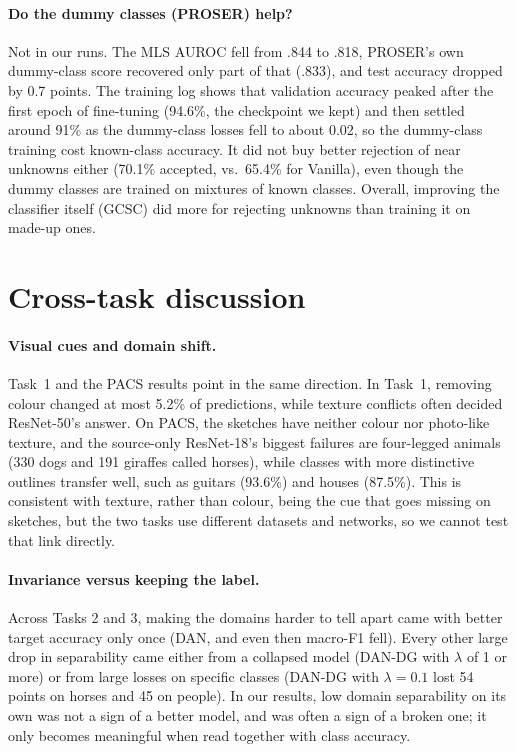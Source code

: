 \documentclass{article}
\begin{document}
\paragraph{Do the dummy classes (PROSER) help?} Not in our runs. The MLS AUROC fell from .844 to .818, PROSER's own dummy-class score recovered only part of that (.833), and test accuracy dropped by 0.7 points. The training log shows that validation accuracy peaked after the first epoch of fine-tuning (94.6\%, the checkpoint we kept) and then settled around 91\% as the dummy-class losses fell to about 0.02, so the dummy-class training cost known-class accuracy. It did not buy better rejection of near unknowns either (70.1\% accepted, vs.\ 65.4\% for Vanilla), even though the dummy classes are trained on mixtures of known classes. Overall, improving the classifier itself (GCSC) did more for rejecting unknowns than training it on made-up ones.

\section{Cross-task discussion}\label{sec:disc}
\paragraph{Visual cues and domain shift.} Task~1 and the PACS results point in the same direction. In Task~1, removing colour changed at most 5.2\% of predictions, while texture conflicts often decided ResNet-50's answer. On PACS, the sketches have neither colour nor photo-like texture, and the source-only ResNet-18's biggest failures are four-legged animals (330 dogs and 191 giraffes called horses), while classes with more distinctive outlines transfer well, such as guitars (93.6\%) and houses (87.5\%). This is consistent with texture, rather than colour, being the cue that goes missing on sketches, but the two tasks use different datasets and networks, so we cannot test that link directly.

\paragraph{Invariance versus keeping the label.} Across Tasks 2 and 3, making the domains harder to tell apart came with better target accuracy only once (DAN, and even then macro-F1 fell). Every other large drop in separability came either from a collapsed model (DAN-DG with $\lambda$ of 1 or more) or from large losses on specific classes (DAN-DG with $\lambda{=}0.1$ lost 54 points on horses and 45 on people). In our results, low domain separability on its own was not a sign of a better model, and was often a sign of a broken one; it only becomes meaningful when read together with class accuracy.
\end{document}

